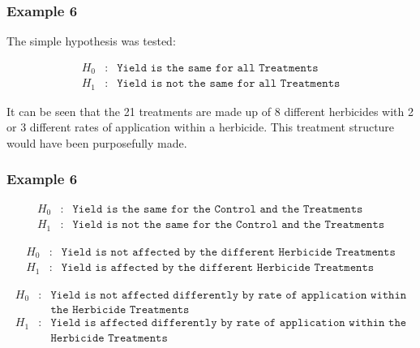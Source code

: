 \begin{frame}\frametitle{Example 6}
The simple hypothesis was tested:

\begin{eqnarray*}
	H_0&:& \texttt{Yield is the same for all Treatments} \\
	H_1&:& \texttt{Yield is not the same for all Treatments}
\end{eqnarray*}

It can be seen that the 21 treatments are made up of 8 different herbicides with 2 or 3 different rates of application
within a herbicide. This treatment structure would have been purposefully made.
\end{frame}


\begin{frame}\frametitle{Example 6}

\begin{eqnarray*}
	H_0&:& \texttt{Yield is the same for the Control and the Treatments} \\
	H_1&:& \texttt{Yield is not the same for the Control and the Treatments}
\end{eqnarray*}

\begin{eqnarray*}
	H_0&:& \texttt{Yield is not affected by the different Herbicide Treatments} \\
	H_1&:& \texttt{Yield is affected by the different Herbicide Treatments}
\end{eqnarray*}

\begin{eqnarray*}
	H_0&:& \texttt{Yield is not affected differently by rate of application within} \\
&& \texttt{the Herbicide Treatments} \\
	H_1&:& \texttt{Yield is affected differently by rate of application within the} \\
&&\texttt{Herbicide Treatments}
\end{eqnarray*}

\end{frame}


